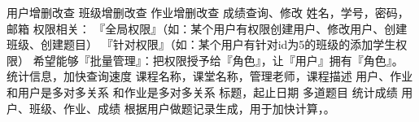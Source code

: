\markdownRendererInterblockSeparator
{}\markdownRendererInterblockSeparator
{}\markdownRendererUlBeginTight
\markdownRendererUlItem 用户增删改查\markdownRendererUlItemEnd 
\markdownRendererUlItem 班级增删改查\markdownRendererUlItemEnd 
\markdownRendererUlItem 作业增删改查\markdownRendererUlItemEnd 
\markdownRendererUlItem 成绩查询、修改\markdownRendererUlItemEnd 
\markdownRendererUlEndTight \markdownRendererInterblockSeparator
{}\markdownRendererInterblockSeparator
{}\markdownRendererUlBeginTight
\markdownRendererUlItem 姓名，学号，密码，邮箱\markdownRendererUlItemEnd 
\markdownRendererUlItem 权限相关：\markdownRendererInterblockSeparator
{}\markdownRendererUlBeginTight
\markdownRendererUlItem 『全局权限』（如：某个用户有权限创建用户、修改用户、创建班级、创建题目）\markdownRendererUlItemEnd 
\markdownRendererUlItem 『针对权限』（如：某个用户有针对id为5的班级的添加学生权限）\markdownRendererUlItemEnd 
\markdownRendererUlItem 希望能够『批量管理』：把权限授予给『角色』，让『用户』拥有『角色』。\markdownRendererUlItemEnd 
\markdownRendererUlEndTight \markdownRendererUlItemEnd 
\markdownRendererUlItem 统计信息，加快查询速度\markdownRendererUlItemEnd 
\markdownRendererUlEndTight \markdownRendererInterblockSeparator
{}\markdownRendererInterblockSeparator
{}\markdownRendererUlBeginTight
\markdownRendererUlItem 课程名称，课堂名称，管理老师，课程描述\markdownRendererUlItemEnd 
\markdownRendererUlItem 用户、作业\markdownRendererInterblockSeparator
{}\markdownRendererUlBeginTight
\markdownRendererUlItem 和用户是多对多关系\markdownRendererUlItemEnd 
\markdownRendererUlItem 和作业是多对多关系\markdownRendererUlItemEnd 
\markdownRendererUlEndTight \markdownRendererUlItemEnd 
\markdownRendererUlEndTight \markdownRendererInterblockSeparator
{}\markdownRendererInterblockSeparator
{}\markdownRendererUlBeginTight
\markdownRendererUlItem 标题，起止日期\markdownRendererUlItemEnd 
\markdownRendererUlItem 多道题目\markdownRendererUlItemEnd 
\markdownRendererUlItem 统计成绩\markdownRendererUlItemEnd 
\markdownRendererUlEndTight \markdownRendererInterblockSeparator
{}\markdownRendererInterblockSeparator
{}\markdownRendererUlBeginTight
\markdownRendererUlItem 用户、班级、作业、成绩\markdownRendererUlItemEnd 
\markdownRendererUlItem 根据用户做题记录生成，用于加快计算，。\markdownRendererUlItemEnd 
\markdownRendererUlEndTight \markdownRendererInterblockSeparator
